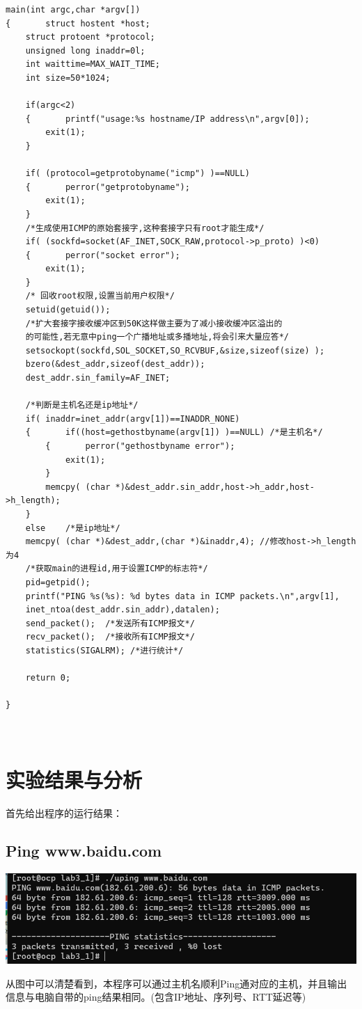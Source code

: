 \documentclass[UTF8]{ctexart}
\begin{document}
\par{
\begin{lstlisting}
main(int argc,char *argv[])
{       struct hostent *host;
	struct protoent *protocol;
	unsigned long inaddr=0l;
	int waittime=MAX_WAIT_TIME;
	int size=50*1024;
	
	if(argc<2)
	{       printf("usage:%s hostname/IP address\n",argv[0]);
		exit(1);
	}
	
	if( (protocol=getprotobyname("icmp") )==NULL)
	{       perror("getprotobyname");
		exit(1);
	}
	/*生成使用ICMP的原始套接字,这种套接字只有root才能生成*/
	if( (sockfd=socket(AF_INET,SOCK_RAW,protocol->p_proto) )<0)
	{       perror("socket error");
		exit(1);
	}
	/* 回收root权限,设置当前用户权限*/
	setuid(getuid());
	/*扩大套接字接收缓冲区到50K这样做主要为了减小接收缓冲区溢出的
	的可能性,若无意中ping一个广播地址或多播地址,将会引来大量应答*/
	setsockopt(sockfd,SOL_SOCKET,SO_RCVBUF,&size,sizeof(size) );
	bzero(&dest_addr,sizeof(dest_addr));
	dest_addr.sin_family=AF_INET;
	
	/*判断是主机名还是ip地址*/
	if( inaddr=inet_addr(argv[1])==INADDR_NONE)
	{       if((host=gethostbyname(argv[1]) )==NULL) /*是主机名*/
		{       perror("gethostbyname error");
			exit(1);
		}
		memcpy( (char *)&dest_addr.sin_addr,host->h_addr,host->h_length);
	}
	else    /*是ip地址*/
	memcpy( (char *)&dest_addr,(char *)&inaddr,4); //修改host->h_length为4
	/*获取main的进程id,用于设置ICMP的标志符*/
	pid=getpid();
	printf("PING %s(%s): %d bytes data in ICMP packets.\n",argv[1],
	inet_ntoa(dest_addr.sin_addr),datalen);
	send_packet();  /*发送所有ICMP报文*/
	recv_packet();  /*接收所有ICMP报文*/
	statistics(SIGALRM); /*进行统计*/
	
	return 0;
	
}

	
\end{lstlisting}
}

\section{实验结果与分析}
\par{首先给出程序的运行结果：\\}
\subsection{Ping www.baidu.com}
\par\centerline{\includegraphics[scale=0.6]{fig2.png}}
\par{从图中可以清楚看到，本程序可以通过主机名顺利Ping通对应的主机，并且输出信息与电脑自带的ping结果相同。(包含IP地址、序列号、RTT延迟等)}
\end{document}
